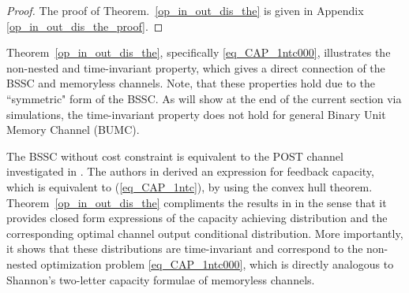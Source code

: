 \documentclass[11pt, a4paper, journal,onecolumn]{IEEEtran}
\newcommand{\sr}{\stackrel}
\newcommand{\rar}{\rightarrow}
\newcommand{\tri}{\sr{\triangle}{=}}
\newcommand{\bea}{\begin{eqnarray}}
\newcommand{\eea}{\end{eqnarray}}
\newcommand{\hso}{\hspace{.1in}}
\newtheorem{corollary}{Corollary}[section]
\begin{document}
\begin{proof}
The proof of Theorem.~\ref{op_in_out_dis_the} is given in Appendix \ref{op_in_out_dis_the_proof}.\end{proof}
\par Theorem~\ref{op_in_out_dis_the}, specifically \eqref{eq_CAP_1ntc000}, illustrates the non-nested and time-invariant property, which gives a direct connection of the BSSC and  memoryless channels. Note, that these properties hold due to the ``symmetric" form of the BSSC. As will show at the end of the current section via simulations, the time-invariant property does not hold for  general Binary Unit Memory Channel (BUMC).
\par The BSSC without cost constraint is equivalent to the POST channel investigated in \cite{asnani13j}. The authors in \cite{asnani13j} derived an expression for feedback capacity, which is equivalent to (\ref{eq_CAP_1ntc}), by using the convex hull theorem. Theorem~\ref{op_in_out_dis_the} compliments the results in \cite{asnani13j} in the sense that it provides closed form expressions of the capacity achieving distribution and the corresponding optimal channel output conditional distribution. More importantly, it shows that these distributions are time-invariant and correspond to the non-nested optimization problem \eqref{eq_CAP_1ntc000}, which is directly analogous to Shannon's two-letter capacity formulae of memoryless channels.
\end{document}
